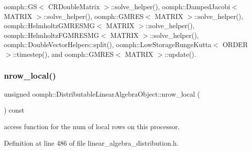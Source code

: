 oomph\+::\+G\+S$<$ C\+R\+Double\+Matrix $>$\+::solve\+\_\+helper(), oomph\+::\+Damped\+Jacobi$<$ M\+A\+T\+R\+I\+X $>$\+::solve\+\_\+helper(), oomph\+::\+G\+M\+R\+E\+S$<$ M\+A\+T\+R\+I\+X $>$\+::solve\+\_\+helper(), oomph\+::\+Helmholtz\+G\+M\+R\+E\+S\+M\+G$<$ M\+A\+T\+R\+I\+X $>$\+::solve\+\_\+helper(), oomph\+::\+Helmholtz\+F\+G\+M\+R\+E\+S\+M\+G$<$ M\+A\+T\+R\+I\+X $>$\+::solve\+\_\+helper(), oomph\+::\+Double\+Vector\+Helpers\+::split(), oomph\+::\+Low\+Storage\+Runge\+Kutta$<$ O\+R\+D\+E\+R $>$\+::timestep(), and oomph\+::\+G\+M\+R\+E\+S$<$ M\+A\+T\+R\+I\+X $>$\+::update().

\mbox{\label{classoomph_1_1DistributableLinearAlgebraObject_a9bd7e1d242c69a28da85a804a7717fce}} 
\subsubsection{\texorpdfstring{nrow\+\_\+local()}{nrow\_local()}\hspace{0.1cm}{\footnotesize\ttfamily [1/2]}}
{\footnotesize\ttfamily unsigned oomph\+::\+Distributable\+Linear\+Algebra\+Object\+::nrow\+\_\+local (\begin{DoxyParamCaption}{ }\end{DoxyParamCaption}) const\hspace{0.3cm}{\ttfamily [inline]}}



access function for the num of local rows on this processor. 



Definition at line 486 of file linear\+\_\+algebra\+\_\+distribution.\+h.



